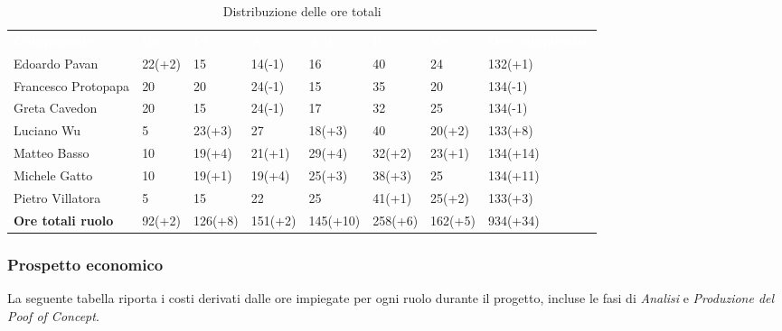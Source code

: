 \begin{table}[H]
	\begin{center}
	\renewcommand{\arraystretch}{1.25}
	\begin{tabular}{ m{}<{\centering}  m{}<{\centering} m{}<{\centering} m{}<{\centering}  m{}<{\centering}  m{}<{\centering}  m{}<{\centering}  m{}<{\centering}   }
		\rowcolor{darkblue}
		\textcolor{white}{\textbf{Componente}} &\textcolor{white}{\textbf{Re}}&\textcolor{white}{\textbf{Pt}}&\textcolor{white}{\textbf{An}}&\textcolor{white}{\textbf{Am}}&\textcolor{white}{\textbf{Pr}}&\textcolor{white}{\textbf{Ve}}&\textcolor{white}{\textbf{Ore complessive}}\\ 
		Edoardo Pavan & 22(+2) & 15 & 14(-1) & 16 & 40 & 24 & 132(+1) \\	
		
		Francesco Protopapa & 20 & 20 & 24(-1) & 15 & 35 & 20 & 134(-1) \\
	
		Greta Cavedon & 20 & 15 & 24(-1) & 17 & 32 & 25 & 134(-1) \\
		
		Luciano Wu & 5 & 23(+3) & 27 & 18(+3) & 40 & 20(+2) & 133(+8) \\
		
		Matteo Basso & 10 & 19(+4) & 21(+1) & 29(+4) & 32(+2) & 23(+1) & 134(+14) \\
		
		Michele Gatto & 10 & 19(+1) & 19(+4) & 25(+3) & 38(+3) & 25 & 134(+11) \\
		
		Pietro Villatora & 5 & 15 & 22 & 25 & 41(+1) & 25(+2) & 133(+3) \\
		
		\textbf{Ore totali ruolo} & 92(+2) & 126(+8) & 151(+2) & 145(+10) & 258(+6) & 162(+5) & 934(+34) \\
	
\end{tabular}
\caption{Distribuzione delle ore totali}
\end{center}
\end{table}

\subsubsection{Prospetto economico}
La seguente tabella riporta i costi derivati dalle ore impiegate per ogni ruolo durante il progetto, incluse le fasi di \textit{Analisi} e \textit{Produzione del Poof of Concept}.

